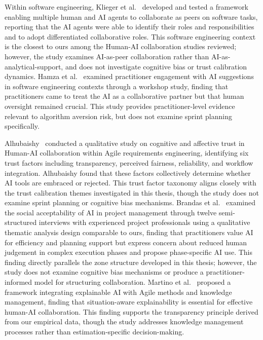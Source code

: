 \documentclass[a4paper,twoside]{bth}
\begin{document}
Within software engineering, Klieger et al.~\cite{klieger2024chatcollab} developed and tested a framework enabling multiple human and AI agents to collaborate as peers on software tasks, reporting that the AI agents were able to identify their roles and responsibilities and to adopt differentiated collaborative roles. This software engineering context is the closest to ours among the Human-AI collaboration studies reviewed; however, the study examines AI-as-peer collaboration rather than AI-as-analytical-support, and does not investigate cognitive bias or trust calibration dynamics. Hamza et al.~\cite{hamza2024human} examined practitioner engagement with AI suggestions in software engineering contexts through a workshop study, finding that practitioners came to treat the AI as a collaborative partner but that human oversight remained crucial. This study provides practitioner-level evidence relevant to algorithm aversion risk, but does not examine sprint planning specifically.

Alhubaishy~\cite{alhubaishy2026exploring} conducted a qualitative study on cognitive and affective trust in Human-AI collaboration within Agile requirements engineering, identifying six trust factors including transparency, perceived fairness, reliability, and workflow integration. Alhubaishy found that these factors collectively determine whether AI tools are embraced or rejected. This trust factor taxonomy aligns closely with the trust calibration themes investigated in this thesis, though the study does not examine sprint planning or cognitive bias mechanisms. Brandas et al.~\cite{brandas2026social} examined the social acceptability of AI in project management through twelve semi-structured interviews with experienced project professionals using a qualitative thematic analysis design comparable to ours, finding that practitioners value AI for efficiency and planning support but express concern about reduced human judgement in complex execution phases and propose phase-specific AI use. This finding directly parallels the zone structure developed in this thesis; however, the study does not examine cognitive bias mechanisms or produce a practitioner-informed model for structuring collaboration. Martino et al.~\cite{martino2025knowledge} proposed a framework integrating explainable AI with Agile methods and knowledge management, finding that situation-aware explainability is essential for effective human-AI collaboration. This finding supports the transparency principle derived from our empirical data, though the study addresses knowledge management processes rather than estimation-specific decision-making.
\end{document}
